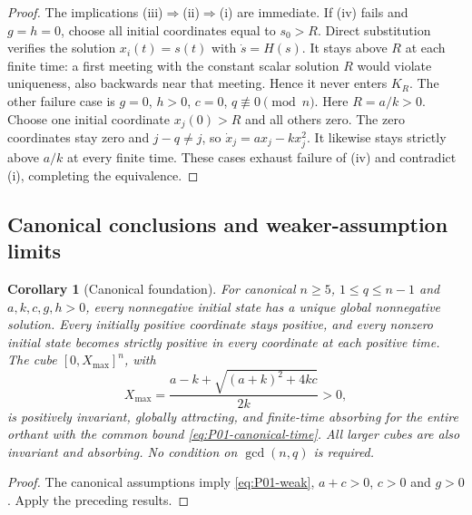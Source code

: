 \documentclass[11pt]{article}
\newtheorem{corollary}[theorem]{Corollary}
\theoremstyle{definition}
\theoremstyle{remark}
\begin{document}
\begin{proof}
The implications (iii)$\Rightarrow$(ii)$\Rightarrow$(i) are immediate.
If (iv) fails and $g=h=0$, choose all initial coordinates equal to
$s_0>R$. Direct substitution verifies the solution $x_i(t)=s(t)$
with $\dot s=H(s)$. It stays above $R$ at each finite time:
a first meeting with the constant scalar solution $R$ would violate
uniqueness, also backwards near that meeting. Hence it never enters
$K_R$. The other failure case is $g=0$, $h>0$, $c=0$,
$q\not\equiv0\pmod n$. Here $R=a/k>0$. Choose one initial coordinate
$x_j(0)>R$ and all others zero. The zero coordinates stay zero and
$j-q\ne j$, so $\dot x_j=a x_j-kx_j^2$. It likewise stays strictly
above $a/k$ at every finite time. These cases exhaust failure of (iv)
and contradict (i), completing the equivalence.
\end{proof}

\subsection{Canonical conclusions and weaker-assumption limits}
\label{slot:P01-4}

\begin{corollary}[Canonical foundation]
\label{cor:P01-canonical}
For canonical $n\ge5$, $1\le q\le n-1$ and $a,k,c,g,h>0$, every
nonnegative initial state has a unique global nonnegative solution.
Every initially positive coordinate stays positive, and every nonzero
initial state becomes strictly positive in every coordinate at each
positive time. The cube $[0,X_{\max}]^n$, with
\[
 X_{\max}=\frac{a-k+\sqrt{(a+k)^2+4kc}}{2k}>0,
\]
is positively invariant, globally attracting, and finite-time absorbing
for the entire orthant with the common bound
\eqref{eq:P01-canonical-time}. All larger cubes are also invariant
and absorbing. No condition on $\gcd(n,q)$ is required.
\end{corollary}
\begin{proof}
The canonical assumptions imply \eqref{eq:P01-weak}, $a+c>0$,
$c>0$ and $g>0$. Apply the preceding results.
\end{proof}
\end{document}
